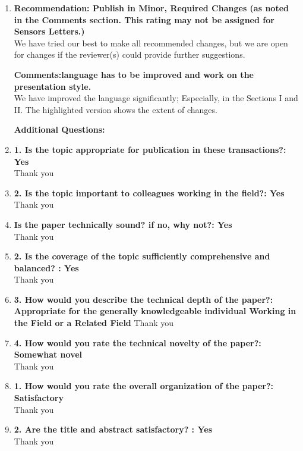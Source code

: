 \documentclass[11pt]{article}
\begin{document}
\begin{enumerate}
	\item \textbf{Recommendation: Publish in Minor, Required Changes (as noted in the Comments section. This rating may not be assigned for Sensors Letters.)
}\\
We have tried our best to make all recommended changes, but we are open for changes if the reviewer(s) could provide further suggestions.

\textbf{Comments:language has to be improved and work on the presentation style.
} \\
We have improved the language significantly; Especially, in the Sections I and II. The highlighted version shows the extent of changes.

\textbf{\textbf{Additional Questions:}}
\item\textbf{1. Is the topic appropriate for publication in these transactions?: Yes
}\\
Thank you

\item\textbf{2. Is the topic important to colleagues working in the field?: Yes}\\
Thank you

\item\textbf{Is the paper technically sound? if no, why not?: Yes}\\
Thank you
%

\item\textbf{2. Is the coverage of the topic sufficiently comprehensive and balanced? : Yes
}\\
Thank you

\item\textbf{3. How would you describe the technical depth of the paper?: Appropriate for the generally knowledgeable individual Working in the Field or a Related Field}
Thank you

\item\textbf{4. How would you rate the technical novelty of the paper?: Somewhat novel}\\
Thank you

\item\textbf{1. How would you rate the overall organization of the paper?: Satisfactory}\\
Thank you

\item\textbf{2. Are the title and abstract satisfactory? : Yes}\\
Thank you


\end{enumerate}
\end{document}
